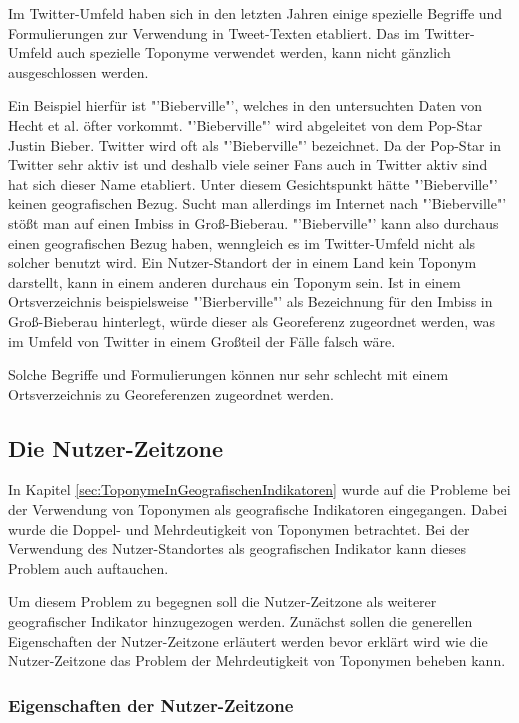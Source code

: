 				Im Twitter-Umfeld haben sich in den letzten Jahren einige spezielle Begriffe und Formulierungen zur Verwendung in Tweet-Texten etabliert. 
				Das im Twitter-Umfeld auch spezielle Toponyme verwendet werden, kann nicht gänzlich ausgeschlossen werden. 

				Ein Beispiel hierfür ist "'Bieberville"', welches in den untersuchten Daten von Hecht et al. öfter vorkommt.
				"'Bieberville"' wird abgeleitet von dem Pop-Star Justin Bieber.	
				Twitter wird oft als "'Bieberville"' bezeichnet.
				Da der Pop-Star in Twitter sehr aktiv ist und deshalb viele seiner Fans auch in Twitter aktiv sind hat sich dieser Name etabliert.
				Unter diesem Gesichtspunkt hätte "'Bieberville"' keinen geografischen Bezug.
				Sucht man allerdings im Internet nach "'Bieberville"' stößt man auf einen Imbiss in Groß-Bieberau.
				"'Bieberville"' kann also durchaus einen geografischen Bezug haben, wenngleich es im Twitter-Umfeld nicht als solcher benutzt wird. 
				Ein Nutzer-Standort der in einem Land kein Toponym darstellt, kann in einem anderen durchaus ein Toponym sein.
				Ist in einem Ortsverzeichnis beispielsweise "'Bierberville"' als Bezeichnung für den Imbiss in Groß-Bieberau hinterlegt, würde dieser als Georeferenz zugeordnet werden, was im Umfeld von Twitter in einem Großteil der Fälle falsch wäre.

				Solche Begriffe und Formulierungen können nur sehr schlecht mit einem Ortsverzeichnis zu Georeferenzen zugeordnet werden. 

		\subsection{Die Nutzer-Zeitzone}

			In Kapitel \ref{sec:ToponymeInGeografischenIndikatoren} wurde auf die Probleme bei der Verwendung von Toponymen als geografische Indikatoren eingegangen.
			Dabei wurde die Doppel- und Mehrdeutigkeit von Toponymen betrachtet.
			Bei der Verwendung des Nutzer-Standortes als geografischen Indikator kann dieses Problem auch auftauchen. 

			Um diesem Problem zu begegnen soll die Nutzer-Zeitzone als weiterer geografischer Indikator hinzugezogen werden.
			Zunächst sollen die generellen Eigenschaften der Nutzer-Zeitzone erläutert werden bevor erklärt wird wie die Nutzer-Zeitzone das Problem der Mehrdeutigkeit von Toponymen beheben kann.

			\subsubsection{Eigenschaften der Nutzer-Zeitzone}

